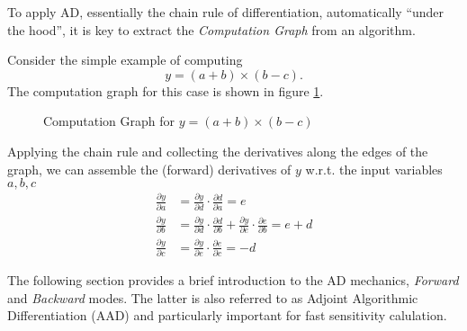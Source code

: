 To apply AD, essentially the chain rule of differentiation, automatically ``under
the hood'', it is key to extract the {\em Computation Graph} from an algorithm.

Consider the simple example of computing
$$
y = (a + b) \times (b - c).
$$
The computation graph for this case is shown in figure \ref{fig:cg}.

\begin{center}
  \begin{figure}[hbt]
    \caption{Computation Graph for $y = (a + b) \times (b - c)$}
    \label{fig:cg}
  \end{figure}
\end{center}

Applying the chain rule and collecting the derivatives along the edges of the graph, we can assemble
the (forward) derivatives of $y$ w.r.t. the input variables $a, b, c$
\begin{align*}
  \frac{\partial y}{\partial a} &= \frac{\partial y}{\partial d} \cdot \frac{\partial d}{\partial a} = e\\
  \frac{\partial y}{\partial b} &= \frac{\partial y}{\partial d} \cdot \frac{\partial d}{\partial b} +  \frac{\partial y}{\partial e} \cdot \frac{\partial e}{\partial b} = e + d \\
  \frac{\partial y}{\partial c} &= \frac{\partial y}{\partial e} \cdot \frac{\partial e}{\partial c} = -d
  \end{align*}

The following section provides a brief introduction to the AD mechanics, {\em Forward} and {\em Backward} modes. The latter is also referred to as Adjoint Algorithmic Differentiation (AAD) and particularly important for fast sensitivity calulation.

